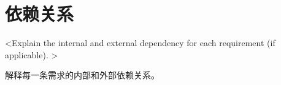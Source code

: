\chapter{依赖关系}
<Explain the internal and external dependency for each requirement (if applicable). >

解释每一条需求的内部和外部依赖关系。
